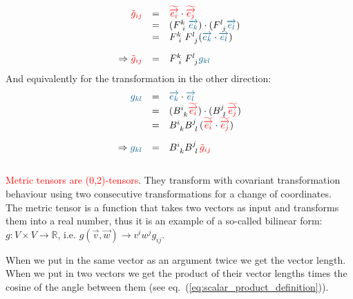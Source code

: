 \begin{equation}
    \begin{array}{rcl}
        \textcolor{red}{\tilde{g}_{ij}}
        & = & \hdbtv{i} \cdot \hdbtv{j} \\
        & = & (F^{k~}_{~i}\hdbv{k}) \cdot (F^{l~}_{~j}\hdbv{l}) \\
        & = & F^{k~}_{~i}  F^{l~}_{~j} (\hdbv{k} \cdot \hdbv{l}) \\
        \noalign{\vskip10pt}
        \Rightarrow\textcolor{red}{\tilde{g}_{ij}} & = &
        F^{k~}_{~i}  F^{l~}_{~j} \textcolor{MidnightBlue}{{g}_{kl}} \\
    \end{array}
\end{equation}
And equivalently for the transformation in the other direction:
\begin{equation}
    \begin{array}{rcl}
        \textcolor{MidnightBlue}{g_{kl}}
        & = & \hdbv{k} \cdot \hdbv{l} \\
        & = & (B^{i~}_{~k}\hdbtv{i}) \cdot (B^{j~}_{~l}\hdbtv{j}) \\
        & = & B^{i~}_{~k} B^{j~}_{~l} (\hdbtv{i} \cdot \hdbtv{j}) \\
        \noalign{\vskip10pt}
        \Rightarrow \textcolor{MidnightBlue}{g_{kl}} & = &
        B^{i~}_{~k} B^{j~}_{~l} \textcolor{red}{\tilde{g}_{ij}}
    \end{array}
\end{equation} \\

\textcolor{red}{Metric tensors are (0,2)-tensors}. They transform with covariant
transformation behaviour using two consecutive transformations for a change of
coordinates. \\

The metric tensor is a function that takes two vectors as input and transforms them into a
real number, thus it is an example of a so-called bilinear form: $g\!: V \times V
\rightarrow \mathbb{R}$, i.e. $g(\vec{v},\vec{w}) \rightarrow v^i w^j g_{ij}$.

When we put in the same vector as an argument twice we get the vector length. When we put
in two vectors we get the product of their vector lengths times the cosine of the angle
between them (see eq.~(\ref{eq:scalar_product_definition})). \\


